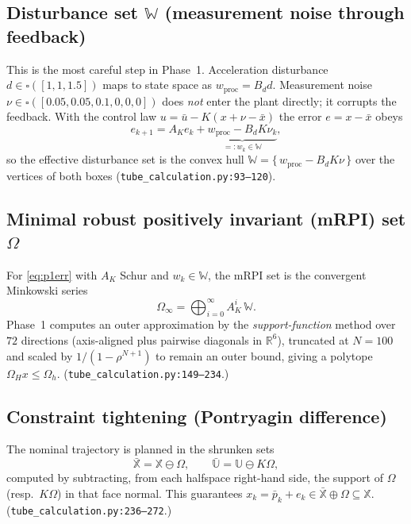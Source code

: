 \documentclass[11pt]{article}
\newcommand{\R}{\mathbb{R}}
\newcommand{\Wset}{\mathbb{W}}
\newcommand{\Xset}{\mathbb{X}}
\newcommand{\Uset}{\mathbb{U}}
\newcommand{\code}[1]{\texttt{#1}}
\begin{document}
\subsection{Disturbance set $\Wset$ (measurement noise through feedback)}
This is the most careful step in Phase~1. Acceleration disturbance $d\in\square([1,1,1.5])$ maps to
state space as $w_{\mathrm{proc}}=B_d d$. Measurement noise $\nu\in\square([0.05,0.05,0.1,0,0,0])$
does \emph{not} enter the plant directly; it corrupts the feedback. With the control law
$u=\bar u-K(x+\nu-\bar x)$ the error $e=x-\bar x$ obeys
\begin{equation}
e_{k+1}=A_Ke_k+\underbrace{w_{\mathrm{proc}}-B_dK\nu_k}_{=:w_k\in\Wset},
\label{eq:p1err}
\end{equation}
so the effective disturbance set is the convex hull
$\Wset=\{\,w_{\mathrm{proc}}-B_dK\nu\,\}$ over the vertices of both boxes
(\code{tube\_calculation.py:93--120}).

\subsection{Minimal robust positively invariant (mRPI) set $\Omega$}
For \eqref{eq:p1err} with $A_K$ Schur and $w_k\in\Wset$, the mRPI set is the convergent Minkowski
series
\begin{equation}
\Omega_\infty=\bigoplus_{i=0}^{\infty}A_K^i\,\Wset .
\end{equation}
Phase~1 computes an outer approximation by the \emph{support-function} method over $72$ directions
(axis-aligned plus pairwise diagonals in $\R^6$), truncated at $N=100$ and scaled by
$1/(1-\rho^{N+1})$ to remain an outer bound, giving a polytope $\Omega_H x\le\Omega_h$.
(\code{tube\_calculation.py:149--234}.)

\subsection{Constraint tightening (Pontryagin difference)}
The nominal trajectory is planned in the shrunken sets
\begin{equation}
\bar{\Xset}=\Xset\ominus\Omega,\qquad \bar{\Uset}=\Uset\ominus K\Omega,
\label{eq:p1tighten}
\end{equation}
computed by subtracting, from each halfspace right-hand side, the support of $\Omega$ (resp.\
$K\Omega$) in that face normal. This guarantees $x_k=\bar p_k+e_k\in\bar{\Xset}\oplus\Omega\subseteq
\Xset$. (\code{tube\_calculation.py:236--272}.)
\end{document}
